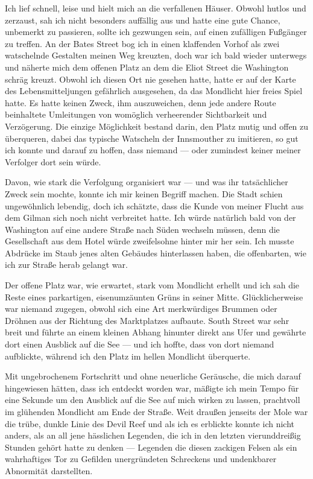Ich lief schnell, leise und hielt mich an die verfallenen Häuser. Obwohl hutlos und zerzaust, sah ich nicht besonders auffällig aus und hatte eine gute Chance, unbemerkt zu passieren, sollte ich gezwungen sein, auf einen zufälligen Fußgänger zu treffen. An der Bates Street bog ich in einen klaffenden Vorhof als zwei watschelnde Gestalten meinen Weg kreuzten, doch war ich bald wieder unterwegs und näherte mich dem offenen Platz an dem die Eliot Street die Washington schräg kreuzt. Obwohl ich diesen Ort nie gesehen hatte, hatte er auf der Karte des Lebensmitteljungen gefährlich ausgesehen, da das Mondlicht hier freies Spiel hatte. Es hatte keinen Zweck, ihm auszuweichen, denn jede andere Route beinhaltete Umleitungen von womöglich verheerender Sichtbarkeit und Verzögerung. Die einzige Möglichkeit bestand darin, den Platz mutig und offen zu überqueren, dabei das typische Watscheln der Innsmouther zu imitieren, so gut ich konnte und darauf zu hoffen, dass niemand --- oder zumindest keiner meiner Verfolger dort sein würde.

Davon, wie stark die Verfolgung organisiert war --- und was ihr tatsächlicher Zweck sein mochte, konnte ich mir keinen Begriff machen. Die Stadt schien ungewöhnlich lebendig, doch ich schätzte, dass die Kunde von meiner Flucht aus dem Gilman sich noch nicht verbreitet hatte. Ich würde natürlich bald von der Washington auf eine andere Straße nach Süden wechseln müssen, denn die Gesellschaft aus dem Hotel würde zweifelsohne hinter mir her sein. Ich musste Abdrücke im Staub jenes alten Gebäudes hinterlassen haben, die offenbarten, wie ich zur Straße herab gelangt war.

Der offene Platz war, wie erwartet, stark vom Mondlicht erhellt und ich sah die Reste eines parkartigen,  eisenumzäunten Grüns in seiner Mitte. Glücklicherweise war niemand zugegen, obwohl sich eine Art merkwürdiges Brummen oder Dröhnen aus der Richtung des Marktplatzes aufbaute. South Street war sehr breit und führte an einem kleinen Abhang hinunter direkt ans Ufer und gewährte dort einen Ausblick auf die See --- und ich hoffte, dass von dort niemand aufblickte, während ich den Platz im hellen Mondlicht überquerte.

Mit ungebrochenem Fortschritt und ohne neuerliche Geräusche, die mich darauf hingewiesen hätten, dass ich entdeckt worden war, mäßigte ich mein Tempo für eine Sekunde um den Ausblick auf die See auf mich wirken zu lassen, prachtvoll im glühenden Mondlicht am Ende der Straße. Weit draußen jenseits der Mole war die trübe, dunkle Linie des Devil Reef und als ich es erblickte konnte ich nicht anders, als an all jene hässlichen Legenden, die ich in den letzten vierunddreißig Stunden gehört hatte zu denken --- Legenden die diesen zackigen Felsen als ein wahrhaftiges Tor zu Gefilden unergründeten Schreckens und undenkbarer Abnormität darstellten.

